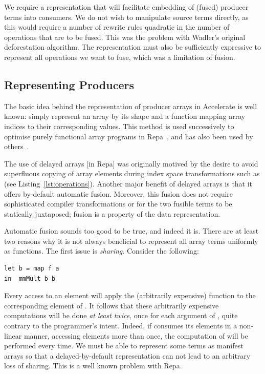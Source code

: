 We require a representation that will facilitate embedding of (fused) producer
terms into consumers. We do not wish to manipulate source terms directly, as
this would require a number of rewrite rules quadratic in the number of
operations that are to be fused. This was the problem with Wadler's original
deforestation algorithm. The representation must also be sufficiently expressive
to represent all operations we want to fuse, which was a limitation of
 fusion.


\subsection{Representing Producers}
\label{sec:representing_producers}

The basic idea behind the representation of producer arrays in Accelerate is
well known: simply represent an array by its shape and a function mapping array
indices to their corresponding values. This method is used successively to
optimise purely functional array programs in Repa~\cite{Keller:2010er}, and has also been used by
others~\cite{Claessen:2012hl}.

The use of delayed arrays [in Repa] was originally motived by the desire to
avoid superfluous copying of array elements during index space transformations
such as  (see Listing~\ref{lst:operations}). Another major
benefit of delayed arrays is that it offers by-default automatic fusion.
Moreover, this fusion does not require sophisticated compiler transformations or
for the two fusible terms to be statically juxtaposed; fusion is a property of
the data representation.

Automatic fusion sounds too good to be true, and indeed it is. There are at
least two reasons why it is not always beneficial to represent all array terms
uniformly as functions. The first issue is \emph{sharing}. Consider the
following:
%
\begin{lstlisting}[style=haskell]
let b = map f a
in  mmMult b b
\end{lstlisting}
%
Every access to an element  will apply the (arbitrarily expensive)
function  to the corresponding element of . It follows that
these arbitrarily expensive computations will be done \emph{at least twice},
once for each argument of , quite contrary to the programmer's
intent. Indeed, if  consumes its elements in a non-linear manner,
accessing elements more than once, the computation of  will be performed
every time. We must be able to represent some terms as manifest arrays so that a
delayed-by-default representation can not lead to an arbitrary loss of sharing.
This is a well known problem with Repa.

